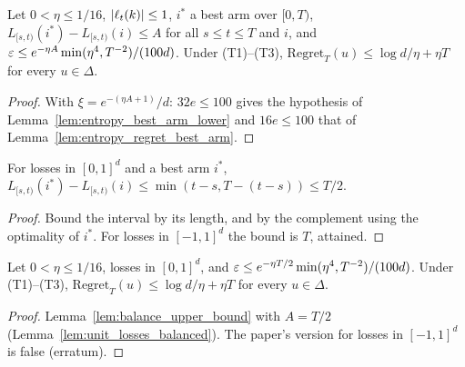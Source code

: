 \begin{lemma}
  \label{lem:balance_upper_bound}
  \leanok
  Let $0 < \eta \le 1/16$, $\lvert \ell_t(k) \rvert \le 1$, $i^*$ a best arm over $[0, T)$,
  $L_{[s,t)}(i^*) - L_{[s,t)}(i) \le A$ for all $s \le t \le T$ and $i$, and
  $\varepsilon \le e^{-\eta A}\min(\eta^4, T^{-2})/(100d)$. Under (T1)--(T3),
  $\mathrm{Regret}_T(u) \le \log d/\eta + \eta T$ for every $u \in \Delta$.
\end{lemma}

\begin{proof}
  \leanok
  With $\xi = e^{-(\eta A + 1)}/d$: $32e \le 100$ gives the hypothesis of
  Lemma~\ref{lem:entropy_best_arm_lower} and $16e \le 100$ that of
  Lemma~\ref{lem:entropy_regret_best_arm}.
\end{proof}

\begin{lemma}
  \label{lem:unit_losses_balanced}
  \leanok
  For losses in $[0, 1]^d$ and a best arm $i^*$,
  $L_{[s,t)}(i^*) - L_{[s,t)}(i) \le \min(t - s, T - (t - s)) \le T/2$.
\end{lemma}

\begin{proof}
  \leanok
  Bound the interval by its length, and by the complement using the optimality of $i^*$. For
  losses in $[-1, 1]^d$ the bound is $T$, attained.
\end{proof}

\begin{theorem}
  \label{thm:up_barrier_adversarial}
  \leanok
  Let $0 < \eta \le 1/16$, losses in $[0, 1]^d$, and
  $\varepsilon \le e^{-\eta T/2}\min(\eta^4, T^{-2})/(100d)$. Under (T1)--(T3),
  $\mathrm{Regret}_T(u) \le \log d/\eta + \eta T$ for every $u \in \Delta$.
\end{theorem}

\begin{proof}
  \leanok
  Lemma~\ref{lem:balance_upper_bound} with $A = T/2$ (Lemma~\ref{lem:unit_losses_balanced}). The
  paper's version for losses in $[-1, 1]^d$ is false (erratum).
\end{proof}

